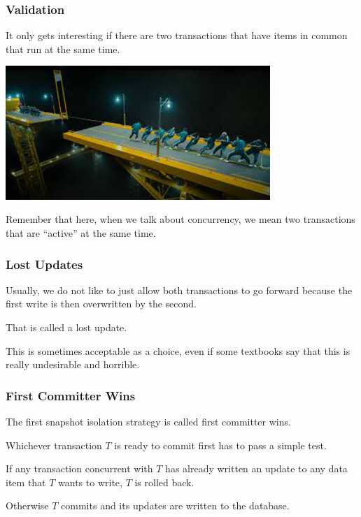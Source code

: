 \begin{frame}
\frametitle{Validation}

It only gets interesting if there are two transactions that have items in common that run at the same time. 

\begin{center}
	\includegraphics[width=0.75\textwidth]{images/tugofwar.jpg}
\end{center}

Remember that here, when we talk about concurrency, we mean two transactions that are ``active'' at the same time.

\end{frame}

\begin{frame}
\frametitle{Lost Updates}
Usually, we do not like to just allow both transactions to go forward because the first write is then overwritten by the second.

That is called a \alert{lost update}. 

This is sometimes  acceptable as a choice, even if some textbooks say that this is really undesirable and horrible.


\end{frame}


\begin{frame}
\frametitle{First Committer Wins}
The first snapshot isolation strategy is called \alert{first committer wins}.

Whichever transaction $T$ is ready to commit first has to pass a simple test. 

If any transaction concurrent with $T$ has already written an update to any data item that $T$ wants to write, $T$ is rolled back. 


Otherwise $T$ commits and its updates are written to the database. 


\end{frame}


